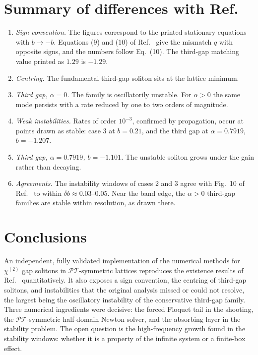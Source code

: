 \documentclass[pra,twocolumn,superscriptaddress,longbibliography]{revtex4-2}
\newcommand{\PT}{\mathcal{PT}}
\newcommand{\chit}{\chi^{(2)}}
\begin{document}
\section{Summary of differences with Ref.~\cite{MKM2013}}
\begin{enumerate}
\item \emph{Sign convention.} The figures correspond to the printed stationary equations with
$b\to-b$. Equations (9) and (10) of Ref.~\cite{MKM2013} give the mismatch $q$ with opposite signs,
and the numbers follow Eq.~(10). The third-gap matching value printed as $1.29$ is $-1.29$.
\item \emph{Centring.} The fundamental third-gap soliton sits at the lattice minimum.
\item \emph{Third gap, $\alpha=0$.} The family is oscillatorily unstable. For $\alpha>0$ the same
mode persists with a rate reduced by one to two orders of magnitude.
\item \emph{Weak instabilities.} Rates of order $10^{-3}$, confirmed by propagation, occur at
points drawn as stable: case 3 at $b=0.21$, and the third gap at $\alpha=0.7919$, $b=-1.207$.
\item \emph{Third gap, $\alpha=0.7919$, $b=-1.101$.} The unstable soliton grows under the gain
rather than decaying.
\item \emph{Agreements.} The instability windows of cases 2 and 3 agree with Fig.~10 of
Ref.~\cite{MKM2013} to within $\delta b\approx0.03$--$0.05$. Near the band edge, the $\alpha>0$
third-gap families are stable within resolution, as drawn there.
\end{enumerate}

\section{Conclusions}
An independent, fully validated implementation of the numerical methods for $\chit$ gap solitons
in $\PT$-symmetric lattices reproduces the existence results of Ref.~\cite{MKM2013} quantitatively.
It also exposes a sign convention, the centring of third-gap solitons, and instabilities that the
original analysis missed or could not resolve, the largest being the oscillatory instability of
the conservative third-gap family. Three numerical ingredients were decisive: the forced Floquet
tail in the shooting, the $\PT$-symmetric half-domain Newton solver, and the absorbing layer in
the stability problem. The open question is the high-frequency growth found in the stability windows: whether it is a
property of the infinite system or a finite-box effect.
\end{document}
